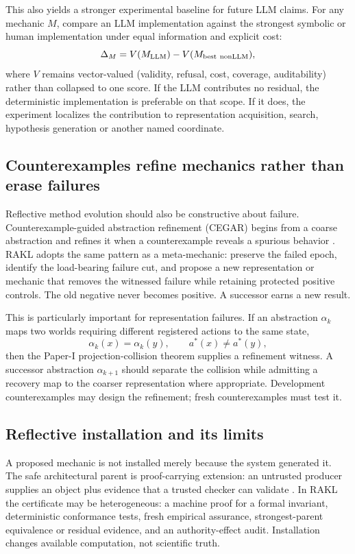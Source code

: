 This also yields a stronger experimental baseline for future LLM claims. For any mechanic $M$, compare an LLM implementation against the strongest symbolic or human implementation under equal information and explicit cost:
\[
\Delta_M=V(M_{\rm LLM})-V(M_{\rm best\ nonLLM}),
\]
where $V$ remains vector-valued (validity, refusal, cost, coverage, auditability) rather than collapsed to one score. If the LLM contributes no residual, the deterministic implementation is preferable on that scope. If it does, the experiment localizes the contribution to representation acquisition, search, hypothesis generation or another named coordinate.

\subsection{Counterexamples refine mechanics rather than erase failures}

Reflective method evolution should also be constructive about failure. Counterexample-guided abstraction refinement (CEGAR) begins from a coarse abstraction and refines it when a counterexample reveals a spurious behavior \cite{clarke2000cegar}. RAKL adopts the same pattern as a meta-mechanic: preserve the failed epoch, identify the load-bearing failure cut, and propose a new representation or mechanic that removes the witnessed failure while retaining protected positive controls. The old negative never becomes positive. A successor earns a new result.

This is particularly important for representation failures. If an abstraction $\alpha_k$ maps two worlds requiring different registered actions to the same state,
\[
\alpha_k(x)=\alpha_k(y),\qquad a^*(x)\ne a^*(y),
\]
then the Paper-I projection-collision theorem supplies a refinement witness. A successor abstraction $\alpha_{k+1}$ should separate the collision while admitting a recovery map to the coarser representation where appropriate. Development counterexamples may design the refinement; fresh counterexamples must test it.

\subsection{Reflective installation and its limits}

A proposed mechanic is not installed merely because the system generated it. The safe architectural parent is proof-carrying extension: an untrusted producer supplies an object plus evidence that a trusted checker can validate \cite{necula1997pcc}. In RAKL the certificate may be heterogeneous: a machine proof for a formal invariant, deterministic conformance tests, fresh empirical assurance, strongest-parent equivalence or residual evidence, and an authority-effect audit. Installation changes available computation, not scientific truth.

